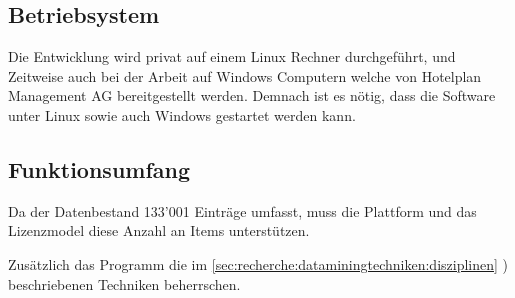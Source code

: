 \subsection{Betriebsystem}
Die Entwicklung wird privat auf einem Linux Rechner durchgeführt, und Zeitweise auch bei der Arbeit auf Windows Computern welche von Hotelplan Management AG bereitgestellt werden.
Demnach ist es nötig, dass die Software unter Linux sowie auch Windows gestartet werden kann.

\subsection{Funktionsumfang}
Da der Datenbestand 133'001 Einträge umfasst, muss die Plattform und das Lizenzmodel diese Anzahl an Items unterstützen.

Zusätzlich das Programm die im \cref{sec:recherche:dataminingtechniken:disziplinen} ) beschriebenen Techniken beherrschen. 

